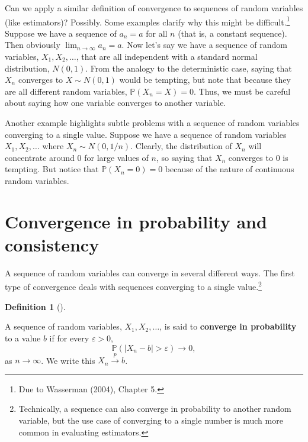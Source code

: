 \documentclass[
  letterpaper,
  DIV=11,
  numbers=noendperiod]{scrreprt}
\renewcommand{\P}{\mathbb{P}}
\newcommand{\inprob}{\overset{p}{\to}}
\theoremstyle{plain}
\theoremstyle{definition}
\theoremstyle{definition}
\newtheorem{definition}{Definition}[chapter]
\theoremstyle{remark}
\begin{document}
Can we apply a similar definition of convergence to sequences of random
variables (like estimators)? Possibly. Some examples clarify why this
might be difficult.\footnote{Due to Wasserman (2004), Chapter 5.}
Suppose we have a sequence of \(a_n = a\) for all \(n\) (that is, a
constant sequence). Then obviously
\(\lim_{n\rightarrow\infty} a_n = a\). Now let's say we have a sequence
of random variables, \(X_1, X_2, \ldots\), that are all independent with
a standard normal distribution, \(N(0,1)\). From the analogy to the
deterministic case, saying that \(X_n\) converges to \(X \sim N(0, 1)\)
would be tempting, but note that because they are all different random
variables, \(\P(X_n = X) = 0\). Thus, we must be careful about saying
how one variable converges to another variable.

Another example highlights subtle problems with a sequence of random
variables converging to a single value. Suppose we have a sequence of
random variables \(X_1, X_2, \ldots\) where \(X_n \sim N(0, 1/n)\).
Clearly, the distribution of \(X_n\) will concentrate around 0 for large
values of \(n\), so saying that \(X_n\) converges to 0 is tempting. But
notice that \(\P(X_n = 0) = 0\) because of the nature of continuous
random variables.

\hypertarget{convergence-in-probability-and-consistency}{%
\section{Convergence in probability and
consistency}\label{convergence-in-probability-and-consistency}}

A sequence of random variables can converge in several different ways.
The first type of convergence deals with sequences converging to a
single value.\footnote{Technically, a sequence can also converge in
  probability to another random variable, but the use case of converging
  to a single number is much more common in evaluating estimators.}

\begin{definition}[]\protect\hypertarget{def-inprob}{}\label{def-inprob}

A sequence of random variables, \(X_1, X_2, \ldots\), is said to
\textbf{converge in probability} to a value \(b\) if for every
\(\varepsilon > 0\), \[
\P(|X_n - b| > \varepsilon) \rightarrow 0,
\] as \(n\rightarrow \infty\). We write this \(X_n \inprob b\).

\end{definition}
\end{document}
